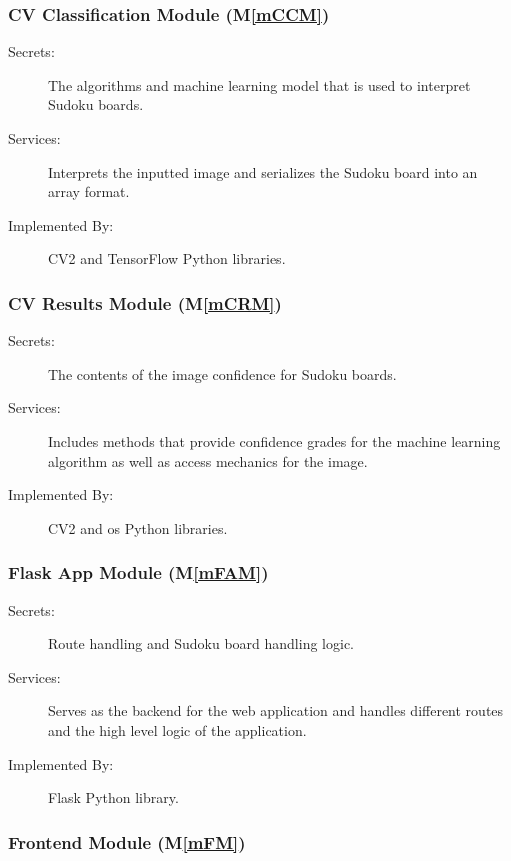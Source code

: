 \documentclass[12pt, titlepage]{article}
\newcommand{\mref}[1]{M\ref{#1}}
\begin{document}
\subsubsection{CV Classification Module (\mref{mCCM})}

\begin{description}
\item[Secrets:] The algorithms and machine learning model that is used to interpret Sudoku boards.
\item[Services:] Interprets the inputted image and serializes the Sudoku board into an array format.
\item[Implemented By:] CV2 and TensorFlow Python libraries.
\end{description}

\subsubsection{CV Results Module (\mref{mCRM})}

\begin{description}
\item[Secrets:] The contents of the image confidence for Sudoku boards.
\item[Services:] Includes methods that provide confidence grades for the machine learning algorithm as well as access mechanics for the image.
\item[Implemented By:] CV2 and os Python libraries.
\end{description}

\subsubsection{Flask App Module (\mref{mFAM})}

\begin{description}
\item[Secrets:] Route handling and Sudoku board handling logic.
\item[Services:] Serves as the backend for the web application and handles different routes and the high level logic of the application.
\item[Implemented By:] Flask Python library.
\end{description}

\subsubsection{Frontend Module (\mref{mFM})}
\end{document}
